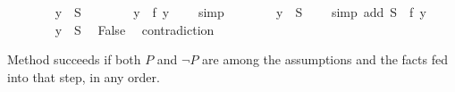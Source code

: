 \begin{isabellebody}
\ \ \ \ \ \ \isamarkupfalse%
\ {\isachardoublequoteopen}y\ {\isasymnotin}\ {\isacharquery}S{\isachardoublequoteclose}\isanewline
\ \ \ \ \ \ \isamarkupfalse%
\ {\isachardoublequoteopen}y\ {\isasymin}\ f\ y{\isachardoublequoteclose}\ \ \ \isamarkupfalse%
\ simp\isanewline
\ \ \ \ \ \ \isamarkupfalse%
\ {\isachardoublequoteopen}y\ {\isasymin}\ {\isacharquery}S{\isachardoublequoteclose}\ \ \ \ \isamarkupfalse%
{\isacharparenleft}simp\ add{\isacharcolon}\ {\isacharbackquoteopen}{\isacharquery}S\ {\isacharequal}\ f\ y{\isacharbackquoteclose}{\isacharparenright}\isanewline
\ \ \ \ \ \ \isamarkupfalse%
\ {\isacharbackquoteopen}y\ {\isasymnotin}\ {\isacharquery}S{\isacharbackquoteclose}\ \isamarkupfalse%
\ False\ \isamarkupfalse%
\ contradiction\isanewline
\ \ \ \ \isamarkupfalse%
\isanewline
\ \ \isamarkupfalse%
\isanewline
{}\isamarkupfalse%
%
\endisatagproof
{\isafoldproof}%
%
\isadelimproof
%
\endisadelimproof
%
\begin{isamarkuptext}%
\noindent Method  succeeds if both $P$ and
$\neg P$ are among the assumptions and the facts fed into that step, in any order.


\end{isamarkuptext}
\end{isabellebody}
